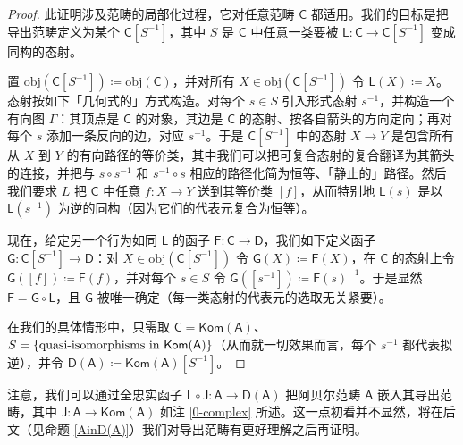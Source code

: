 \begin{proof}
	此证明涉及范畴的局部化过程，它对任意范畴 $\mathsf{C}$ 都适用。我们的目标是把导出范畴定义为某个 $\mathsf{C}[S^{-1}]$，其中 $S$ 是 $\mathsf{C}$ 中任意一类要被 $\mathsf{L}:\mathsf{C}\rightarrow\mathsf{C}[S^{-1}]$ 变成同构的态射。
	
	置 $\text{obj}(\mathsf{C}[S^{-1}])\coloneqq \text{obj}(\mathsf{C})$，并对所有 $X\in\text{obj}(\mathsf{C}[S^{-1}])$ 令 $\mathsf{L}(X)\coloneqq X$。态射按如下「几何式的」方式构造。对每个 $s\in S$ 引入形式态射 $s^{-1}$，并构造一个有向图 $\Gamma$：其顶点是 $\mathsf{C}$ 的对象，其边是 $\mathsf{C}$ 的态射、按各自箭头的方向定向；再对每个 $s$ 添加一条反向的边，对应 $s^{-1}$。于是 $\mathsf{C}[S^{-1}]$ 中的态射 $X\rightarrow Y$ 是包含所有从 $X$ 到 $Y$ 的有向路径的等价类，其中我们可以把可复合态射的复合翻译为其箭头的连接，并把与 $s\circ s^{-1}$ 和 $s^{-1}\circ s$ 相应的路径化简为恒等、「静止的」路径。然后我们要求 $L$ 把 $\mathsf{C}$ 中任意 $f:X\rightarrow Y$ 送到其等价类 $[f]$，从而特别地 $\mathsf{L}(s)$ 是以 $\mathsf{L}(s^{-1})$ 为逆的同构（因为它们的代表元复合为恒等）。
	
	现在，给定另一个行为如同 $\mathsf{L}$ 的函子 $\mathsf{F}:\mathsf{C}\rightarrow\mathsf{D}$，我们如下定义函子 $\mathsf{G}:\mathsf{C}[S^{-1}]\rightarrow\mathsf{D}$：对 $X\in\text{obj}(\mathsf{C}[S^{-1}])$ 令 $\mathsf{G}(X)\coloneqq \mathsf{F}(X)$，在 $\mathsf{C}$ 的态射上令 $\mathsf{G}([f])\coloneqq\mathsf{F}(f)$，并对每个 $s\in S$ 令 $\mathsf{G}([s^{-1}])\coloneqq\mathsf{F}(s)^{-1}$。于是显然 $\mathsf{F}=\mathsf{G}\circ\mathsf{L}$，且 $\mathsf{G}$ 被唯一确定（每一类态射的代表元的选取无关紧要）。
	
	在我们的具体情形中，只需取 $\mathsf{C}=\mathsf{Kom(A)}$、$S=\{\text{quasi-isomorphisms in }\break\mathsf{Kom(A)}\}$（从而就一切效果而言，每个 $s^{-1}$ 都代表拟逆），并令 $\mathsf{D(A)}\coloneqq\mathsf{Kom(A)}[S^{-1}]$。 
\end{proof}


注意，我们可以通过全忠实函子 $\mathsf{L}\circ\mathsf{J}:\mathsf{A}\rightarrow\mathsf{D(A)}$ 把阿贝尔范畴 $\mathsf{A}$ 嵌入其导出范畴，其中 $\mathsf{J}:\mathsf{A}\rightarrow\mathsf{Kom(A)}$ 如注 \ref{0-complex} 所述。这一点初看并不显然，将在后文（见命题 \ref{AinD(A)}）我们对导出范畴有更好理解之后再证明。


